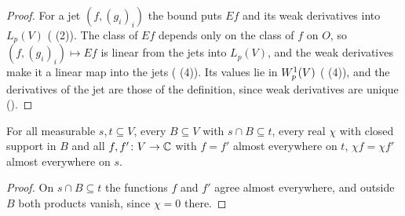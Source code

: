 \begin{proof}
\leanok
For a jet $(f, (g_i)_i)$ the bound puts $E f$ and its weak derivatives into $L_p(V)$
( (2)). The class of $E f$ depends only on the class of $f$
on $O$, so $(f, (g_i)_i) \mapsto E f$ is linear from the jets into $L_p(V)$, and the weak
derivatives make it a linear map into the jets ( (4)). Its values lie in
$W^{1}_{p}(V)$ ( (4)), and the derivatives of the jet
are those of the definition, since weak derivatives are unique ().
\end{proof}

\begin{lemma}
\label{lem:cutoff-ae-eq}
\leanok
For all measurable $s, t \subseteq V$, every $B \subseteq V$ with $s \cap B \subseteq t$, every
real $\chi$ with closed support in $B$ and all $f, f' \colon V \to \mathbb{C}$ with $f = f'$ almost
everywhere on $t$, $\chi f = \chi f'$ almost everywhere on $s$.
\end{lemma}

\begin{proof}
\leanok
On $s \cap B \subseteq t$ the functions $f$ and $f'$ agree almost everywhere, and outside $B$
both products vanish, since $\chi = 0$ there.
\end{proof}


